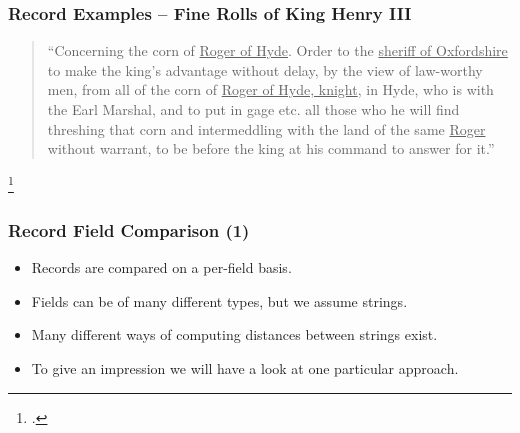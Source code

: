 \documentclass[12pt]{beamer}
\theoremstyle{break}
\begin{document}
\begin{frame}
	\frametitle{Record Examples -- Fine Rolls of King Henry III}
	
	\begin{quote}
		\footnotesize
		``Concerning the corn of \underline{Roger of Hyde}. Order to the \underline{sheriff of Oxfordshire} to make the king’s advantage without delay, by the view of law-worthy men, from all of the corn of \underline{Roger of Hyde, knight}, in Hyde, who is with the Earl Marshal, and to put in gage etc. all those who he will find threshing that corn and intermeddling with the land of the same \underline{Roger} without warrant, to be before the king at his command to answer for it.''\footnotemark
	\end{quote}
	
	\begin{table}
		\footnotesize
		\centering
		
	\end{table}
	
	\footcitetext{FineRolls}
	
\end{frame}




\begin{frame}
	\frametitle{Record Field Comparison (1)}
	
	\begin{itemize}
		\item Records are compared on a \alert{per-field basis}.
		\item Fields can be of many different types, but we assume \alert{strings}.
		\item Many different ways of computing distances between strings exist.
		\item To give an impression we will have a look at one particular approach.
	\end{itemize}
	
\end{frame}


\end{document}
